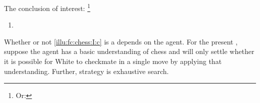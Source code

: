 \begin{note}
  The conclusion of interest:%
  \footnote{
    Or: 
  }

  \begin{enumerate}[label=C\thescenarioCounter., ref=(C\thescenarioCounter)]
  \item
    \label{illu:fc:chess:I:c}
  \end{enumerate}

  \noindent Whether or not \ref{illu:fc:chess:I:c} is a \fc{} depends on the agent.
  For the present \illu{}, suppose the agent has a basic understanding of chess and will only settle whether it is possible for White to checkmate in a single move by applying that understanding.
  Further, strategy is exhaustive search.
\end{note}

